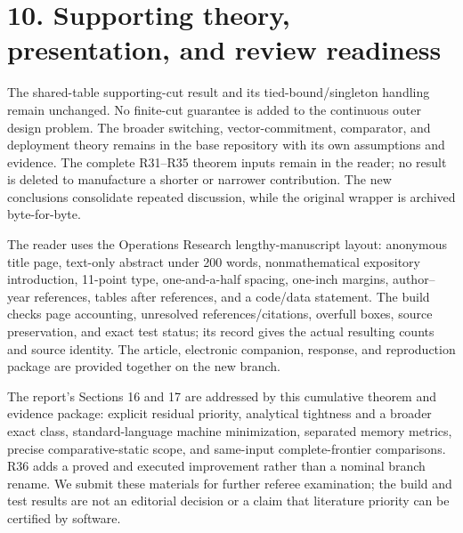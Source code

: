 \documentclass[11pt,letterpaper]{article}
\begin{document}
\section*{10. Supporting theory, presentation, and review readiness}

The shared-table supporting-cut result and its tied-bound/singleton handling remain unchanged. No finite-cut guarantee is added to the continuous outer design problem. The broader switching, vector-commitment, comparator, and deployment theory remains in the base repository with its own assumptions and evidence. The complete R31--R35 theorem inputs remain in the reader; no result is deleted to manufacture a shorter or narrower contribution. The new conclusions consolidate repeated discussion, while the original wrapper is archived byte-for-byte.


The reader uses the Operations Research lengthy-manuscript layout: anonymous title page, text-only abstract under 200 words, nonmathematical expository introduction, 11-point type, one-and-a-half spacing, one-inch margins, author--year references, tables after references, and a code/data statement. The build checks page accounting, unresolved references/citations, overfull boxes, source preservation, and exact test status; its record gives the actual resulting counts and source identity. The article, electronic companion, response, and reproduction package are provided together on the new branch.


The report's Sections 16 and 17 are addressed by this cumulative theorem and evidence package: explicit residual priority, analytical tightness and a broader exact class, standard-language machine minimization, separated memory metrics, precise comparative-static scope, and same-input complete-frontier comparisons. R36 adds a proved and executed improvement rather than a nominal branch rename. We submit these materials for further referee examination; the build and test results are not an editorial decision or a claim that literature priority can be certified by software.\par 
\end{document}
